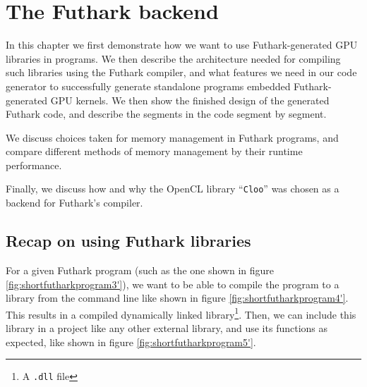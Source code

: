 \chapter{The Futhark \csharp{} backend}
In this chapter we first demonstrate how we want to use Futhark-generated
\csharp{} GPU libraries in \csharp{} programs. We then describe the architecture
needed for compiling such \csharp{} libraries using the Futhark compiler, and
what features we need in our code generator to successfully generate standalone
\csharp{} programs embedded Futhark-generated GPU kernels. 
We then show the finished design of the generated Futhark \csharp{} code, and
describe the segments in the code segment by segment.

We discuss choices taken for memory management in Futhark \csharp{} programs,
and compare different methods of memory management by their runtime performance.

Finally, we discuss how and why the OpenCL library ``\texttt{Cloo}'' was chosen
as a backend for Futhark's \csharp{} compiler.

\section{Recap on using Futhark \csharp{} libraries}
For a given Futhark program (such as the one shown in figure \ref{fig:shortfutharkprogram3'}), 
we want to be able to compile the program to a
\csharp{} library from the command line like shown in figure \ref{fig:shortfutharkprogram4'}.
This results in a compiled \csharp{} dynamically linked library\footnote{A
  \texttt{.dll} file}.
Then, we can include this library in a \csharp{} project like any other external
library, and use its functions as expected, like shown in figure \ref{fig:shortfutharkprogram5'}.

